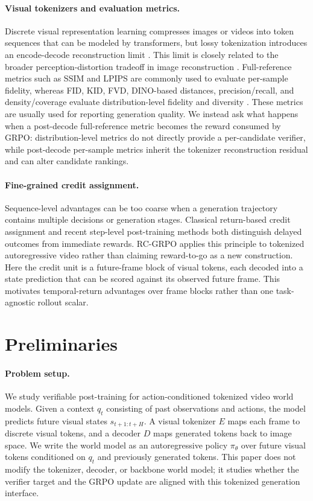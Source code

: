 \documentclass[letterpaper]{article} %
\begin{document}
\paragraph{Visual tokenizers and evaluation metrics.}
Discrete visual representation learning compresses images or videos into token sequences that can be modeled by transformers, but lossy tokenization introduces an encode-decode reconstruction limit \citep{vqvae,vqgan,fsq}. This limit is closely related to the broader perception-distortion tradeoff in image reconstruction \citep{perceptiondistortion}. Full-reference metrics such as SSIM and LPIPS are commonly used to evaluate per-sample fidelity, whereas FID, KID, FVD, DINO-based distances, precision/recall, and density/coverage evaluate distribution-level fidelity and diversity \citep{ssim,lpips,fid,kid,fvd,dinov2,precisionrecall,densitycoverage}. These metrics are usually used for reporting generation quality. We instead ask what happens when a post-decode full-reference metric becomes the reward consumed by GRPO: distribution-level metrics do not directly provide a per-candidate verifier, while post-decode per-sample metrics inherit the tokenizer reconstruction residual and can alter candidate rankings.

\paragraph{Fine-grained credit assignment.}
Sequence-level advantages can be too coarse when a generation trajectory contains multiple decisions or generation stages. Classical return-based credit assignment and recent step-level post-training methods both distinguish delayed outcomes from immediate rewards. RC-GRPO applies this principle to tokenized autoregressive video rather than claiming reward-to-go as a new construction. Here the credit unit is a future-frame block of visual tokens, each decoded into a state prediction that can be scored against its observed future frame. This motivates temporal-return advantages over frame blocks rather than one task-agnostic rollout scalar.

\section{Preliminaries}

\paragraph{Problem setup.}
We study verifiable post-training for action-conditioned tokenized video world models. Given a context $q_t$ consisting of past observations and actions, the model predicts future visual states $s_{t+1:t+H}$. A visual tokenizer $E$ maps each frame to discrete visual tokens, and a decoder $D$ maps generated tokens back to image space. We write the world model as an autoregressive policy $\pi_\theta$ over future visual tokens conditioned on $q_t$ and previously generated tokens. This paper does not modify the tokenizer, decoder, or backbone world model; it studies whether the verifier target and the GRPO update are aligned with this tokenized generation interface.
\end{document}
